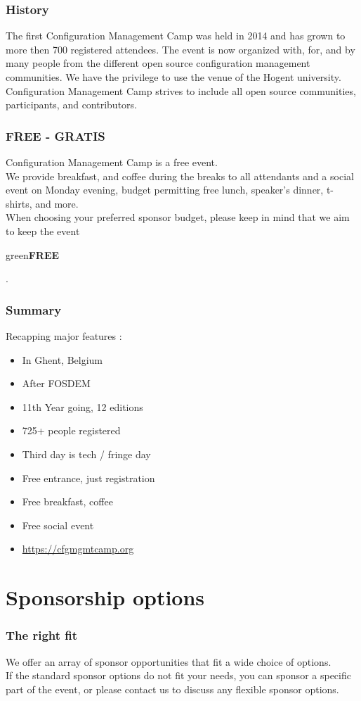 \begin{frame}
\frametitle{History}
The first Configuration Management Camp was held in 2014 and has grown to more then 700 registered attendees.
The event is now organized with, for, and by many people from the different open source configuration management communities.
We have the privilege to use the venue of the Hogent university.
Configuration Management Camp strives to include all open source communities, participants, and contributors.
\end{frame}

\begin{frame}
\frametitle{FREE - GRATIS}
Configuration Management Camp is a free event.\\
We provide breakfast, and coffee during the breaks to all attendants and a social event on Monday evening,
budget permitting free lunch, speaker's dinner, t-shirts, and more.\\
When choosing your preferred sponsor budget, please keep in mind that we aim to keep the event \begin{color}{green}\textbf{FREE}\end{color}.\\
\end{frame}

\begin{frame}
\frametitle{Summary}
Recapping major features :
\begin{itemize}
	\item<+->
	In Ghent, Belgium
	\item<+->
	After FOSDEM
	\item<+->
	11th Year going, 12 editions
	\item<+->
	725+ people registered
	\item<+->
	Third day is tech / fringe day
	\item<+->
	Free entrance, just registration
	\item<+->
	Free breakfast, coffee
	\item<+->
	Free social event
	\item<+->
	\url{https://cfgmgmtcamp.org}
\end{itemize}
\end{frame}

\section{Sponsorship options}

\begin{frame}
\frametitle{The right fit}
We offer an array of sponsor opportunities that fit a wide choice of options.\\
If the standard sponsor options do not fit your needs, you can sponsor a specific part of the event, or 
please contact us to discuss any flexible sponsor options.
\end{frame}

